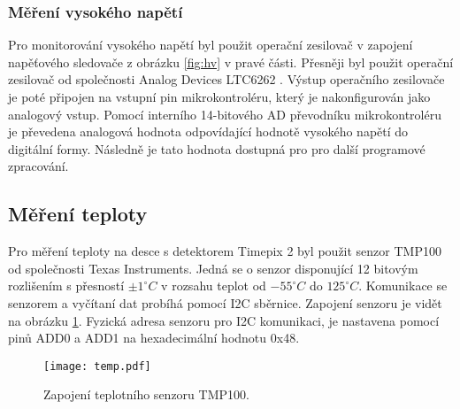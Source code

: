 	\subsubsection{Měření vysokého napětí} %
	Pro monitorování vysokého napětí byl použit operační zesilovač v zapojení napěťového sledovače z obrázku \ref{fig:hv} v pravé části. Přesněji byl použit operační zesilovač od společnosti Analog Devices LTC6262 \cite{LTC6252}. Výstup operačního zesilovače je poté připojen na vstupní pin mikrokontroléru, který je nakonfigurován jako analogový vstup. Pomocí interního 14-bitového AD převodníku mikrokontroléru je převedena analogová hodnota odpovídající hodnotě vysokého napětí do digitální formy. Následně je tato hodnota dostupná pro pro další programové zpracování. 

	\subsection{Měření teploty}	%
	\label{Mereni teploty}
	Pro měření teploty na desce s detektorem Timepix 2 byl použit senzor TMP100 \cite{TMP100} od společnosti Texas Instruments. Jedná se o senzor disponující 12 bitovým rozlišením s přesností $\pm 1^{\circ} C$ v rozsahu teplot od $-55^{\circ}C$ do $125^{\circ}C$. Komunikace se senzorem a vyčítaní dat probíhá pomocí I2C sběrnice. Zapojení senzoru je vidět na obrázku \ref{fig:tmp100}. Fyzická adresa senzoru pro I2C komunikaci, je nastavena pomocí pinů ADD0 a ADD1 na hexadecimální hodnotu 0x48.
	\begin{figure}[h!]
		\centering
		\captionsetup{justification=centering}
		\texttt{[image: temp.pdf]}
		\caption{Zapojení teplotního senzoru TMP100.} 
		\label{fig:tmp100}
	\end{figure} 
